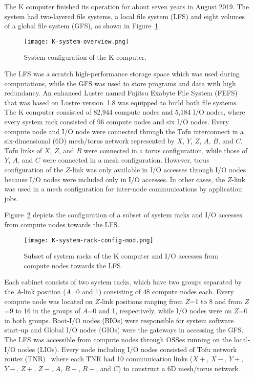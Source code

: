 \documentclass{jhps}
\begin{document}
The K computer finished its operation for about seven years in August 2019.
The system had two-layered file systems, a local file system (LFS)
and eight volumes of a global file system (GFS), as shown in Figure~\ref{fig:K_OVERVIEW}.
%
\begin{figure}[tb]
\centering
\texttt{[image: K-system-overview.png]}
\caption{System configuration of the K computer.}
\label{fig:K_OVERVIEW}
\end{figure}
%
The LFS was a scratch high-performance storage space which was used during computations,
while the GFS was used to store programs and data with high redundancy.
An enhanced Lustre named Fujitsu Exabyte File System (FEFS)~\cite{fefs:fujitsu-tech-si}
that was based on Lustre version~1.8 was equipped to build both file systems.
The K computer consisted of 82,944 compute nodes and 5,184 I/O nodes,
where every system rack consisted of 96 compute nodes and six I/O nodes.
Every compute node and I/O node were connected through the Tofu interconnect
in a six-dimensional (6D) mesh/torus network represented by $X$, $Y$, $Z$, $A$, $B$, and $C$.
Tofu links of $X$, $Z$, and $B$ were connected in a torus configuration,
while those of $Y$, $A$, and $C$ were connected in a mesh configuration.
However, torus configuration of the $Z$-link was only available
in I/O accesses through I/O nodes because I/O nodes were included
only in I/O accesses.
In other cases, the $Z$-link was used in a mesh configuration for
inter-node communications by application jobs.

Figure~\ref{fig:SUBSET_SYSRACK_K} depicts the configuration of a subset of system racks
and I/O accesses from compute nodes towards the LFS.
%
\begin{figure}[tb]
\centering
\texttt{[image: K-system-rack-config-mod.png]}
\caption{Subset of system racks of the K computer and I/O accesses from compute nodes
towards the LFS.}
\label{fig:SUBSET_SYSRACK_K}
\end{figure}
%
Each cabinet consists of two system racks, which have two groups separated
by the $A$-link position ($A$=0 and 1) consisting of 48 compute nodes each.
Every compute node was located on $Z$-link positions ranging from $Z$=1 to 8
and from $Z$=9 to 16 in the groups of $A$=0 and 1, respectively,
while I/O nodes were on $Z$=0 in both groups.
Boot-I/O nodes (BIOs) were responsible for system software start-up and
Global I/O nodes (GIOs) were the gateways in accessing the GFS.
The LFS was accessible from compute nodes through OSSes running
on the local-I/O nodes (LIOs).
Every node including I/O nodes consisted of Tofu network router (TNR)~\cite{tofu:micro2012}
where each TNR had 10 communication links
($X+$, $X-$, $Y+$, $Y-$, $Z+$, $Z-$, $A$, $B+$, $B-$, and $C$)
to construct a 6D mesh/torus network.
\end{document}
